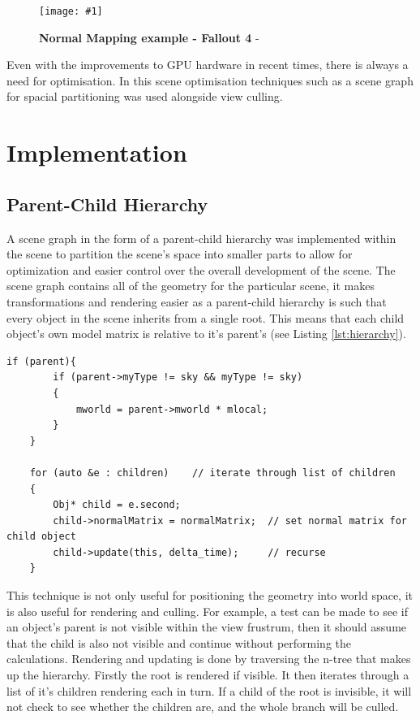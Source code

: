 \documentclass[conference]{acmsiggraph}
\newcommand{\figuremacroW}[4]{
	\begin{figure}[h] %
		\centering
		\texttt{[image: \#1]}
		\caption[#2]{\textbf{#2} - #3}
		\label{fig:#1}
	\end{figure}
}
\begin{document}
\figuremacroW
{fallout}
{Normal Mapping example - Fallout 4}
{\protect\cite{Fallout4}}
{1.0}

Even with the improvements to GPU hardware in recent times, there is always a need for optimisation. In this scene optimisation techniques such as a scene graph for spacial partitioning was used alongside view culling.

\section{Implementation}

\subsection{Parent-Child Hierarchy}

A scene graph in the form of a parent-child hierarchy was implemented within the scene to partition the scene's space into smaller parts to allow for optimization and easier control over the overall development of the scene. The scene graph contains all of the geometry for the particular scene, it makes transformations and rendering easier as a parent-child hierarchy is such that every object in the scene inherits from a single root. This means that each child object's own model matrix is relative to it's parent's (see Listing \ref{lst:hierarchy}).

\begin{lstlisting}[label = {lst:hierarchy}, caption={Parent-child Hierarchy Update Method}]
 	if (parent){
		if (parent->myType != sky && myType != sky)
		{
			mworld = parent->mworld * mlocal;
		}
	}

	for (auto &e : children)    // iterate through list of children
	{
		Obj* child = e.second;
		child->normalMatrix = normalMatrix;  // set normal matrix for child object 
		child->update(this, delta_time);     // recurse
	}
\end{lstlisting}

This technique is not only useful for positioning the geometry into world space, it is also useful for rendering and culling. For example, a test can be made to see if an object's parent is not visible within the view frustrum, then it should assume that the child is also not visible and continue without performing the calculations.
Rendering and updating is done by traversing the n-tree that makes up the hierarchy. Firstly the root is rendered if visible. It then iterates through a list of it's children rendering each in turn. If a child of the root is invisible, it will not check to see whether the children are, and the whole branch will be culled. 
\end{document}
